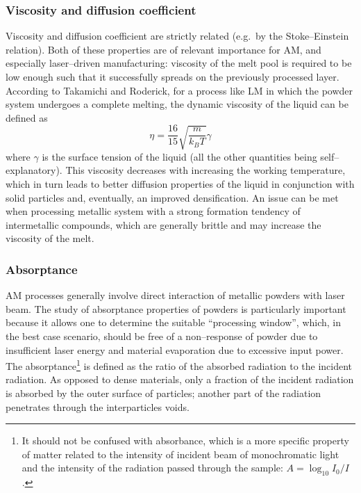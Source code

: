 \subsubsection{Viscosity and diffusion coefficient}
Viscosity and diffusion coefficient are strictly related (e.g.\ by the Stoke--Einstein relation). Both of these properties are of relevant importance for AM, and especially laser--driven manufacturing: viscosity of the melt pool is required to be low enough such that it successfully spreads on the previously processed layer. According to Takamichi and Roderick, for a process like LM in which the powder system undergoes a complete melting, the dynamic viscosity of the liquid can be defined as~\cite{Takamichi1993}
\begin{equation}
    \eta= \frac{16}{15}\sqrt{\frac{m}{k_B T}} \gamma
    \label{eqn:dynamic-viscosity}
\end{equation}
where $\gamma$ is the surface tension of the liquid (all the other quantities being self--explanatory).
This viscosity decreases with increasing the working temperature, which in turn leads to better diffusion properties of the liquid in conjunction with solid particles and, eventually, an improved densification. An issue can be met when processing metallic system with a strong formation tendency of intermetallic compounds, which are generally brittle and may increase the viscosity of the melt.

\subsubsection{Absorptance}
AM processes generally involve direct interaction of metallic powders with laser beam. The study of absorptance properties of powders is particularly important because it allows one to determine the suitable ``processing window'', which, in the best case scenario, should be free of a non--response of powder due to insufficient laser energy and material evaporation due to excessive input power.
The absorptance\footnote{It should not be confused with absorbance, which is a more specific property of matter related to the intensity of incident beam of monochromatic light and the intensity of the radiation passed through the sample: $A=\log_{10}{I_0/I}$.}%
is defined as the ratio of the absorbed radiation to the incident radiation. As opposed to dense materials, only a fraction of the incident radiation is absorbed by the outer surface of particles; another part of the radiation penetrates through the interparticles voids.

